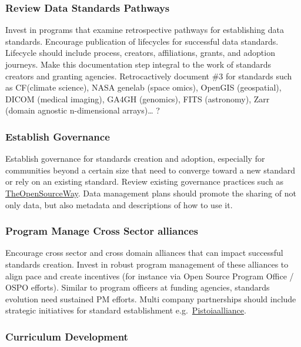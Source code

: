 \documentclass[
  letterpaper,
  DIV=11,
  numbers=noendperiod]{scrartcl}
\begin{document}
\subsubsection{Review Data Standards
Pathways}\label{review-data-standards-pathways}

Invest in programs that examine retrospective pathways for establishing
data standards. Encourage publication of lifecycles for successful data
standards. Lifecycle should include process, creators, affiliations,
grants, and adoption journeys. Make this documentation step integral to
the work of standards creators and granting agencies. Retrocactively
document \#3 for standards such as CF(climate science), NASA genelab
(space omics), OpenGIS (geospatial), DICOM (medical imaging), GA4GH
(genomics), FITS (astronomy), Zarr (domain agnostic n-dimensional
arrays)\ldots{} ?

\subsubsection{Establish Governance}\label{establish-governance}

Establish governance for standards creation and adoption, especially for
communities beyond a certain size that need to converge toward a new
standard or rely on an existing standard. Review existing governance
practices such as
\href{https://www.theopensourceway.org/the_open_source_way-guidebook-2.0.html\#_project_and_community_governance}{TheOpenSourceWay}.
Data management plans should promote the sharing of not only data, but
also metadata and descriptions of how to use it.

\subsubsection{Program Manage Cross Sector
alliances}\label{program-manage-cross-sector-alliances}

Encourage cross sector and cross domain alliances that can impact
successful standards creation. Invest in robust program management of
these alliances to align pace and create incentives (for instance via
Open Source Program Office / OSPO efforts). Similar to program officers
at funding agencies, standards evolution need sustained PM efforts.
Multi company partnerships should include strategic initiatives for
standard establishment
e.g.~\href{https://www.pistoiaalliance.org/news/press-release-pistoia-alliance-launches-idmp-1-0/}{Pistoiaalliance}.

\subsubsection{Curriculum Development}\label{curriculum-development}
\end{document}
